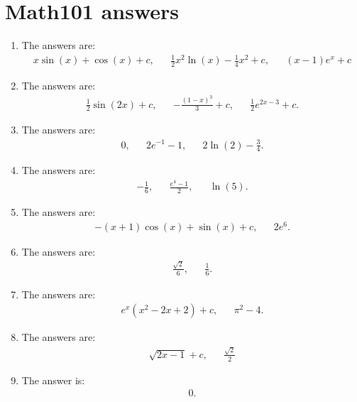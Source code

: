 \newpage
\section{Math101 answers}

\begin{enumerate}
	\item \label{it:int21} The answers are:
	\begin{align*}
	x\sin(x)+\cos(x)+c,&& \frac{1}{2}x^2\ln(x)-\frac{1}{4}x^2+c,&& (x-1)e^x+c
	\end{align*}
	
	\item The answers are:
	\begin{align*}
	\frac{1}{2}\sin(2x)+c,&& -\frac{(1-x)^3}{3}+c,&& \frac{1}{2} e^{2x-3}+c.
	\end{align*}
	
	\item The answers are:
	\begin{align*}
	0,&& 2e^{-1}-1,&& 2\ln(2)-\frac{3}{4}.
	\end{align*}
	
	\item The answers are:
	\begin{align*}
	-\frac{1}{6},&& \frac{e^4-1}{2},&& \ln(5).
	\end{align*}
	
	\item The answers are:
	\begin{align*}
	-(x+1)\cos(x)+\sin(x)+c,&& 2e^{6}.
	\end{align*}
	
	\item The answers are:
	\begin{align*}
	\frac{\sqrt{2}}{6},&& \frac{1}{6}.
	\end{align*}
	
	\item The answers are:
	\begin{align*}
	e^x(x^2-2x+2) +c,&& \pi^2-4.
	\end{align*}
	
	\item The answers are:
	\begin{align*}
	\sqrt{2x-1}+c,&& \frac{\sqrt{2}}{2}
	\end{align*}
	
	\item The answer is:
	\begin{align*}
	0.
	\end{align*}
\end{enumerate}